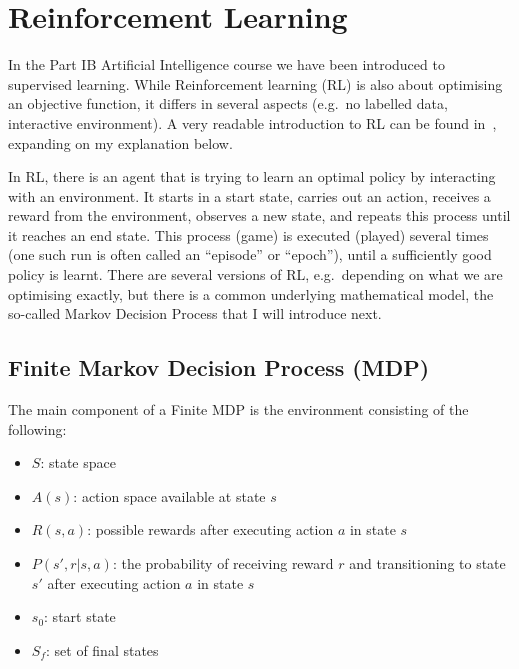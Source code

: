 \section{Reinforcement Learning} \label{RLintro}


In the Part IB Artificial Intelligence course we have been introduced to supervised learning. While Reinforcement learning (RL) is also about optimising an objective function, it differs in several aspects (e.g.\ no labelled data, interactive environment). A very readable introduction to RL can be found in~\cite{sutton2018RLbook}, expanding on my explanation below.


In RL, there is an agent that is trying to learn an optimal policy by interacting with an environment. It starts in a start state, carries out an action, receives a reward from the environment, observes a new state, and repeats this process until it reaches an end state. This process (game) is executed (played) several times (one such run is often called an ``episode'' or ``epoch''), until a sufficiently good policy is learnt. There are several versions of RL, e.g.\ depending on what we are optimising exactly, but there is a common underlying mathematical model, the so-called Markov Decision Process that I will introduce next.

\subsection{Finite Markov Decision Process (MDP)}


The main component of a Finite MDP is the environment consisting of the following:
\begin{itemize}[itemsep=0pt]
    \item  $S$: state space
    \item
    $A(s)$: action space available at state $s$
    \item
    $R(s, a)$: possible rewards after executing action $a$ in state $s$
    \item
    $P(s', r | s, a)$: the probability of receiving reward $r$ and transitioning to state $s'$ after executing action $a$ in state $s$
    \item
    $s_0$: start state
    \item
    $S_f$: set of final states
\end{itemize} 


